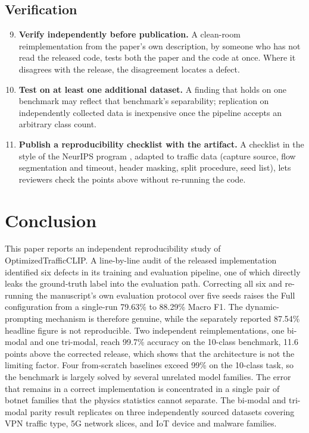 \documentclass[journal]{IEEEtran}
\begin{document}
\subsection{Verification}
\begin{enumerate}
\setcounter{enumi}{8}
\item \textbf{Verify independently before publication.} A clean-room reimplementation from the paper's own description, by someone who has not read the released code, tests both the paper and the code at once. Where it disagrees with the release, the disagreement locates a defect.
\item \textbf{Test on at least one additional dataset.} A finding that holds on one benchmark may reflect that benchmark's separability; replication on independently collected data is inexpensive once the pipeline accepts an arbitrary class count.
\item \textbf{Publish a reproducibility checklist with the artifact.} A checklist in the style of the NeurIPS program \cite{pineau2021}, adapted to traffic data (capture source, flow segmentation and timeout, header masking, split procedure, seed list), lets reviewers check the points above without re-running the code.
\end{enumerate}

\section{Conclusion}

This paper reports an independent reproducibility study of OptimizedTrafficCLIP. A line-by-line audit of the released implementation identified six defects in its training and evaluation pipeline, one of which directly leaks the ground-truth label into the evaluation path. Correcting all six and re-running the manuscript's own evaluation protocol over five seeds raises the Full configuration from a single-run 79.63\% to 88.29\% Macro F1. The dynamic-prompting mechanism is therefore genuine, while the separately reported 87.54\% headline figure is not reproducible. Two independent reimplementations, one bi-modal and one tri-modal, reach 99.7\% accuracy on the 10-class benchmark, 11.6 points above the corrected release, which shows that the architecture is not the limiting factor. Four from-scratch baselines exceed 99\% on the 10-class task, so the benchmark is largely solved by several unrelated model families. The error that remains in a correct implementation is concentrated in a single pair of botnet families that the physics statistics cannot separate. The bi-modal and tri-modal parity result replicates on three independently sourced datasets covering VPN traffic type, 5G network slices, and IoT device and malware families.
\end{document}
